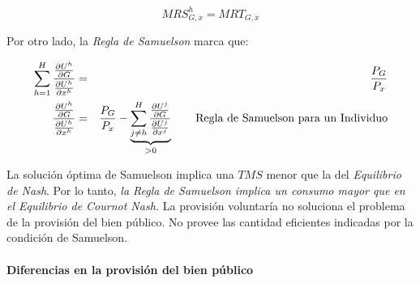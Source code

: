 $$ MRS^h_{G,x}=MRT_{G,x} $$

Por otro lado, la \emph{Regla de Samuelson} marca que: 

\begin{eqnarray}
	\sum_{h=1}^{H} \frac{\frac{\partial U^h}{\partial G}}{\frac{\partial U^h}{\partial x^h}} &=& \frac{P_G}{P_x} \nonumber \\
	\frac{\frac{\partial U^h}{\partial G}}{\frac{\partial U^h}{\partial x^h}} &=& \frac{P_G}{P_x} - \underbrace {\sum_{j \not= h}^{H} \frac{\frac{\partial U^j}{\partial G}}{\frac{\partial U^j}{\partial x^j}}}_{>0} \qquad \textrm{Regla de Samuelson para un Individuo} \nonumber
\end{eqnarray}

La solución óptima de Samuelson implica una $TMS$ menor que la del \emph{Equilibrio de Nash}.  Por lo tanto, \emph{la Regla de Samuelson implica un consumo mayor que en el Equilibrio de Cournot Nash.} La provisión voluntaría no soluciona el problema de la provisión del bien público. No provee las cantidad eficientes indicadas por la condición de Samuelson.

\paragraph{Diferencias en la provisión del bien público}

